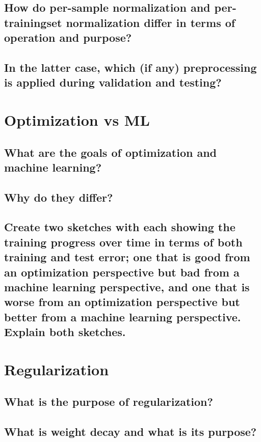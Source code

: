 \subsection{How do per-sample normalization and per-trainingset normalization differ in terms of operation and purpose?}

\subsection{In the latter case, which (if any) preprocessing is applied during validation and testing?}

\section{Optimization vs ML}

\subsection{What are the goals of optimization and machine learning?}

\subsection{Why do they differ?}

\subsection{Create two sketches with each showing the training progress over time in terms of both training and test error; one that is good from an optimization perspective but bad from a machine learning perspective, and one that is worse from an optimization perspective but better from a machine learning perspective. Explain both sketches.}

\section{Regularization}

\subsection{What is the purpose of regularization?}

\subsection{What is weight decay and what is its purpose?}

